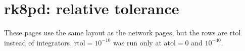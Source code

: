 \documentclass[10pt,a4paper]{article}
\newcommand{\atol}{\mathrm{atol}}
\newcommand{\rtol}{\mathrm{rtol}}
\begin{document}


\appendix
\clearpage
\section{rk8pd: relative tolerance}\label{app:rk8pd}
These pages use the same layout as the network pages, but the rows are $\rtol$ instead of integrators. $\rtol=10^{-10}$ was run only at $\atol=0$ and $10^{-40}$.


\end{document}
